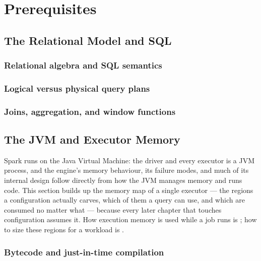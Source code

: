 \chapter{Prerequisites}
\label{ch:prereq}

\tbd


\section{The Relational Model and SQL}
\label{sec:prereq-sql}

\subsection{Relational algebra and SQL semantics}
\tbd

\subsection{Logical versus physical query plans}
\tbd

\subsection{Joins, aggregation, and window functions}
\tbd

\section{The JVM and Executor Memory}
\label{sec:prereq-jvm}

Spark runs on the Java Virtual Machine: the driver and every executor is a JVM
process, and the engine's memory behaviour, its failure modes, and much of its
internal design follow directly from how the JVM manages memory and runs code.
This section builds up the memory map of a single executor --- the regions a
configuration actually carves, which of them a query can use, and which are
consumed no matter what --- because every later chapter that touches
configuration assumes it. How execution memory is used while a job runs is
; how to size these regions for a workload is
.

\subsection{Bytecode and just-in-time compilation}
\tbd

